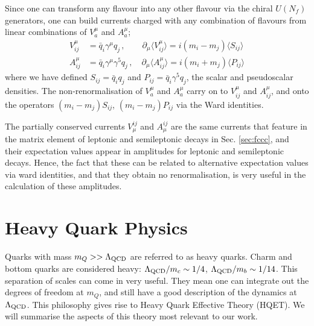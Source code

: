 
Since one can transform any flavour into any other flavour via the chiral $U(N_f)$ generators, one can build currents charged with any combination of flavours from linear combinations of $V_a^{\mu}$ and $A_a^{\mu}$;
\begin{align}
  \label{eq:vector_ward_indiv}
  V_{ij}^{\mu} &= \bar{q}_i \gamma^{\mu} q_j \,,\quad\quad \partial_{\mu}\langle V^{\mu}_{ij} \rangle = i ( m_i - m_j ) \langle S_{ij} \rangle \\
  A_{ij}^{\mu} &= \bar{q}_i \gamma^{\mu}\gamma^5 q_j \,,\quad \partial_{\mu}\langle A^{\mu}_{ij} \rangle = i ( m_i + m_j ) \langle P_{ij} \rangle
  \label{eq:axial_ward_indiv}
\end{align}
where we have defined $S_{ij} = \bar{q}_iq_j$ and $P_{ij} = \bar{q}_i\gamma^5 q_j$, the scalar and pseudoscalar densities. The non-renormalisation of $V_a^{\mu}$ and $A_a^{\mu}$ carry on to $V_{ij}^{\mu}$ and $A_{ij}^{\mu}$, and onto the operators $( m_i - m_j ) S_{ij}$, $( m_i - m_j ) P_{ij}$ via the Ward identities.

The partially conserved currents $V^{ij}_{\mu}$ and $A^{ij}_{\mu}$ are the same currents that feature in the matrix element of leptonic and semileptonic decays in Sec. \ref{sec:fccc}, and their expectation values appear in amplitudes for leptonic and semileptonic decays. Hence, the fact that these can be related to alternative expectation values via ward identities, and that they obtain no renormalisation, is very useful in the calculation of these amplitudes.

\section{Heavy Quark Physics}

Quarks with mass $m_Q >> \Lambda_{\text{QCD}}$ are referred to as heavy quarks. Charm and bottom quarks are considered heavy: $\Lambda_{\text{QCD}}/m_c \sim 1/4$, $\Lambda_{\text{QCD}}/m_b \sim 1/14$. This separation of scales can come in very useful. They mean one can integrate out the degrees of freedom at $m_Q$, and still have a good description of the dynamics at $\Lambda_{\text{QCD}}$. This philosophy gives rise to Heavy Quark Effective Theory (HQET). We will summarise the aspects of this theory most relevant to our work.

